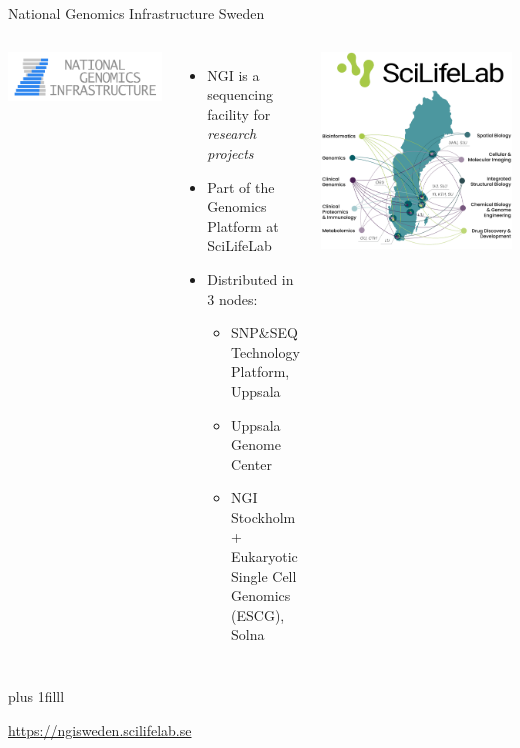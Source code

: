 \documentclass[10pt]{beamer}
\newcommand{\credit}[1]{{\vskip0pt plus 1filll \par \raggedleft \scriptsize \mdseries \color{mDarkBrown} #1 \par}}
\begin{document}
\begin{frame}{National Genomics Infrastructure Sweden}
  \begin{columns}[T]
	\begin{center}
		\hspace*{-1cm}
		\includegraphics[height=0.2\textheight]{./additional_graphics/NGI-logo.png}
	\end{center}
	\begin{itemize}
		\item NGI is a sequencing facility for \emph{research projects} 
		\item Part of the Genomics Platform at SciLifeLab
		\item Distributed in 3 nodes:
		\begin{itemize}
			\item SNP\&SEQ Technology Platform, Uppsala
			\item Uppsala Genome Center
			\item NGI Stockholm + Eukaryotic Single Cell Genomics (ESCG), Solna 
		\end{itemize}
	\end{itemize}
       \vspace*{2cm}
       \includegraphics[width=\textwidth]{./figures/scilifelab-map.png} 
    \end{columns}
	\credit{\href{https://ngisweden.scilifelab.se}{https://ngisweden.scilifelab.se}}
\end{frame}
\end{document}
